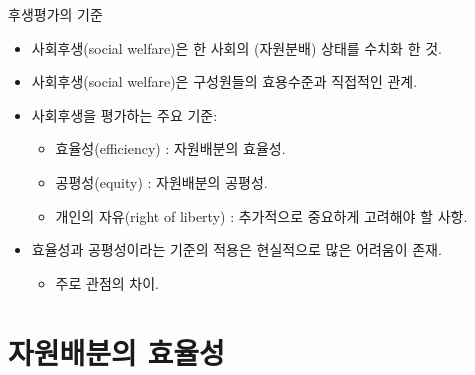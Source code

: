 \documentclass[aspectratio=169,xcolor=dvipsnames,handout]{beamer}
\begin{document}
\begin{frame}{후생평가의 기준}
    \begin{itemize}
        \item 사회후생(social welfare)은 한 사회의 (자원분배) 상태를 수치화 한 것.
        \item 사회후생(social welfare)은 구성원들의 효용수준과 직접적인 관계.
        \item 사회후생을 평가하는 주요 기준:
        \begin{itemize}
            \item 효율성(efficiency) : 자원배분의 효율성.
            \item 공평성(equity) : 자원배분의 공평성.
            \item 개인의 자유(right of liberty) : 추가적으로 중요하게 고려해야 할 사항.
        \end{itemize}
        \item 효율성과 공평성이라는 기준의 적용은 현실적으로 많은 어려움이 존재.
        \begin{itemize}
            \item 주로 관점의 차이.
        \end{itemize}
    \end{itemize}
\end{frame}

\section{자원배분의 효율성}
\end{document}

